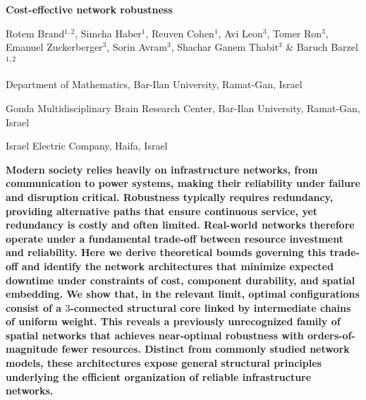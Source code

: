 \documentclass[oneside, a4paper, onecolumn, 11pt]{article}
\begin{document}
\begin{center}
{\color{blue} \LARGE \textbf{Cost-effective network robustness}}


\vspace{3mm}
Rotem Brand$^{1,2}$, Simcha Haber$^{1}$,  Reuven Cohen$^{1}$, Avi Leon$^{3}$, Tomer Ron$^{3}$, Emanuel Zuckerberger$^{3}$, Sorin Avram$^{3}$, Shachar Ganem Thabit$^{3}$ \& Baruch Barzel$^{1,2}$ 
\end{center}

\begin{enumerate}
\small{
\item
Department of Mathematics, Bar-Ilan University, Ramat-Gan, Israel 
\item
Gonda Multidisciplinary Brain Research Center, Bar-Ilan University, Ramat-Gan, Israel
\item 
Israel Electric Company, Haifa, Israel
}
\end{enumerate}

\vspace{2mm}

\hspace{-2.27mm} 
\textbf{
Modern society relies heavily on infrastructure networks, from communication to power systems, making their reliability under failure and disruption critical. Robustness typically requires redundancy, providing alternative paths that ensure continuous service, yet redundancy is costly and often limited. Real-world networks therefore operate under a fundamental trade-off between resource investment and reliability. Here we derive theoretical bounds governing this trade-off and identify the network architectures that minimize expected downtime under constraints of cost, component durability, and spatial embedding. We show that, in the relevant limit, optimal configurations consist of a $3$-connected structural core linked by intermediate chains of uniform weight. This reveals a previously unrecognized family of spatial networks that achieves near-optimal robustness with orders-of-magnitude fewer resources. Distinct from commonly studied network models, these architectures expose general structural principles underlying the efficient organization of reliable infrastructure networks.
}
\end{document}
